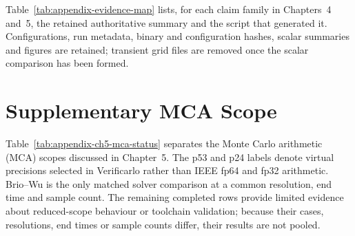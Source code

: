 Table~\ref{tab:appendix-evidence-map} lists, for each claim family in
Chapters~4 and~5, the retained authoritative summary and the script that
generated it. Configurations, run metadata, binary and configuration hashes,
scalar summaries and figures are retained; transient grid files are removed
once the scalar comparison has been formed.



\chapter{Supplementary MCA Scope}
\label{sec:appendix-ch5-mca-status}

Table~\ref{tab:appendix-ch5-mca-status} separates the Monte Carlo arithmetic
(MCA) scopes discussed in Chapter~5. The p53 and p24 labels denote virtual
precisions selected in Verificarlo rather than IEEE fp64 and fp32 arithmetic.
Brio--Wu is the only matched solver comparison at a common resolution, end
time and sample count. The remaining completed rows provide limited evidence
about reduced-scope behaviour or toolchain validation; because their cases,
resolutions, end times or sample counts differ, their results are not pooled.


